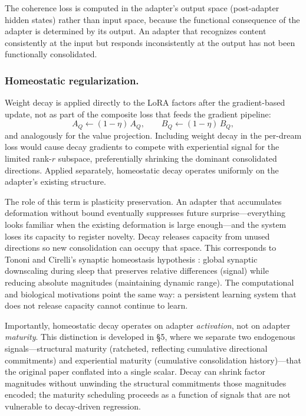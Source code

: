 \documentclass[11pt]{article}
\begin{document}
The coherence loss is computed in the adapter's output space (post-adapter hidden states) rather than input space, because the functional consequence of the adapter is determined by its output. An adapter that recognizes content consistently at the input but responds inconsistently at the output has not been functionally consolidated.

\subsubsection*{Homeostatic regularization.}

Weight decay is applied directly to the LoRA factors after the gradient-based update, not as part of the composite loss that feeds the gradient pipeline:
\begin{equation}
    A_Q \gets (1-\eta)\,A_Q, \qquad B_Q \gets (1-\eta)\,B_Q,
\end{equation}
and analogously for the value projection. Including weight decay in the per-dream loss would cause decay gradients to compete with experiential signal for the limited rank-$r$ subspace, preferentially shrinking the dominant consolidated directions. Applied separately, homeostatic decay operates uniformly on the adapter's existing structure.

The role of this term is plasticity preservation. An adapter that accumulates deformation without bound eventually suppresses future surprise---everything looks familiar when the existing deformation is large enough---and the system loses its capacity to register novelty. Decay releases capacity from unused directions so new consolidation can occupy that space. This corresponds to Tononi and Cirelli's synaptic homeostasis hypothesis \cite{tononi2014}: global synaptic downscaling during sleep that preserves relative differences (signal) while reducing absolute magnitudes (maintaining dynamic range). The computational and biological motivations point the same way: a persistent learning system that does not release capacity cannot continue to learn.

Importantly, homeostatic decay operates on adapter \emph{activation}, not on adapter \emph{maturity}. This distinction is developed in \S 5, where we separate two endogenous signals---structural maturity (ratcheted, reflecting cumulative directional commitments) and experiential maturity (cumulative consolidation history)---that the original paper conflated into a single scalar. Decay can shrink factor magnitudes without unwinding the structural commitments those magnitudes encoded; the maturity scheduling proceeds as a function of signals that are not vulnerable to decay-driven regression.
\end{document}
